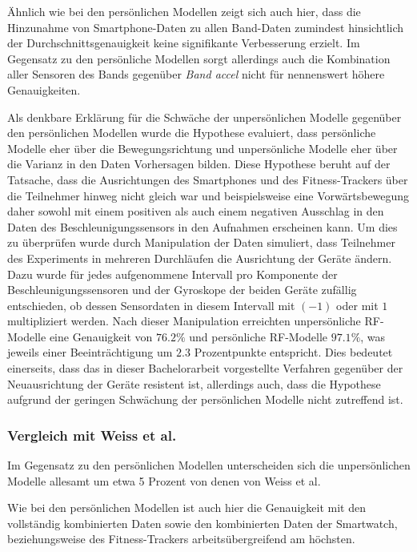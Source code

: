 Ähnlich wie bei den persönlichen Modellen zeigt sich auch hier, dass die Hinzunahme von Smartphone-Daten zu allen Band-Daten zumindest hinsichtlich der Durchschnittsgenauigkeit keine signifikante Verbesserung erzielt. Im Gegensatz zu den persönliche Modellen sorgt allerdings auch die Kombination aller Sensoren des Bands gegenüber \textit{Band accel} nicht für nennenswert höhere Genauigkeiten.

Als denkbare Erklärung für die Schwäche der unpersönlichen Modelle gegenüber den persönlichen Modellen wurde die Hypothese evaluiert, dass persönliche Modelle eher über die Bewegungsrichtung und unpersönliche Modelle eher über die Varianz in den Daten Vorhersagen bilden. Diese Hypothese beruht auf der Tatsache, dass die Ausrichtungen des Smartphones und des Fitness-Trackers über die Teilnehmer hinweg nicht gleich war und beispielsweise eine Vorwärtsbewegung daher sowohl mit einem positiven als auch einem negativen Ausschlag in den Daten des Beschleunigungssensors in den Aufnahmen erscheinen kann. Um dies zu überprüfen wurde durch Manipulation der Daten simuliert, dass Teilnehmer des Experiments in mehreren Durchläufen die Ausrichtung der Geräte ändern. Dazu wurde für jedes aufgenommene Intervall pro Komponente der Beschleunigungssensoren und der Gyroskope der beiden Geräte zufällig entschieden, ob dessen Sensordaten in diesem Intervall mit $(-1)$ oder mit $1$ multipliziert werden. Nach dieser Manipulation erreichten unpersönliche RF-Modelle eine Genauigkeit von $76.2 \%$ und persönliche RF-Modelle $97.1 \%$, was jeweils einer Beeinträchtigung um $2.3$ Prozentpunkte entspricht. Dies bedeutet einerseits, dass das in dieser Bachelorarbeit vorgestellte Verfahren gegenüber der Neuausrichtung der Geräte resistent ist, allerdings auch, dass die Hypothese aufgrund der geringen Schwächung der persönlichen Modelle nicht zutreffend ist.

\subsubsection{Vergleich mit Weiss et al.}
Im Gegensatz zu den persönlichen Modellen unterscheiden sich die unpersönlichen Modelle allesamt um etwa 5 Prozent von denen von Weiss et al. 

Wie bei den persönlichen Modellen ist auch hier die Genauigkeit mit den vollständig kombinierten Daten sowie den kombinierten Daten der Smartwatch, beziehungsweise des Fitness-Trackers arbeitsübergreifend am höchsten.

